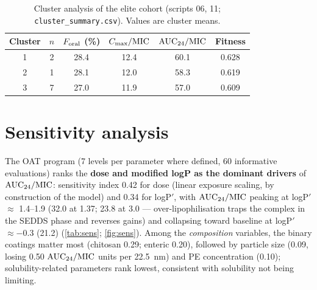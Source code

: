 \begin{table}[htbp]
\centering
\caption{Cluster analysis of the elite cohort (scripts 06, 11; \texttt{cluster\_summary.csv}). Values are cluster means.}
\label{tab:clusters}
\begin{tabular}{cccccc}
\toprule
Cluster & $n$ & $F_{\mathrm{oral}}$ (\%) & $C_{\max}/\mathrm{MIC}$ & $\mathrm{AUC}_{24}/\mathrm{MIC}$ & Fitness\\
\midrule
1 & 2 & 28.4 & 12.4 & 60.1 & 0.628\\
2 & 1 & 28.1 & 12.0 & 58.3 & 0.619\\
3 & 7 & 27.0 & 11.9 & 57.0 & 0.609\\
\bottomrule
\end{tabular}
\end{table}

\section{Sensitivity analysis}
\label{sec:ch4-sens}
The OAT program (7 levels per parameter where defined, 60 informative evaluations) ranks the \textbf{dose and modified logP as the dominant drivers} of $\mathrm{AUC}_{24}/\mathrm{MIC}$: sensitivity index 0.42 for dose (linear exposure scaling, by construction of the model) and 0.34 for logP$'$, with $\mathrm{AUC}_{24}/\mathrm{MIC}$ peaking at logP$'$ $\approx$ 1.4--1.9 (32.0 at 1.37; 23.8 at 3.0 --- over-lipophilisation traps the complex in the SEDDS phase and reverses gains) and collapsing toward baseline at logP$'$ $\approx -0.3$ (21.2) (\cref{tab:sens}; \cref{fig:sens}). Among the \emph{composition} variables, the binary coatings matter most (chitosan 0.29; enteric 0.20), followed by particle size (0.09, losing 0.50 $\mathrm{AUC}_{24}/\mathrm{MIC}$ units per 22.5~nm) and PE concentration (0.10); solubility-related parameters rank lowest, consistent with solubility not being limiting.

